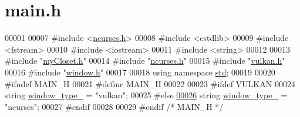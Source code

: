 \hypertarget{main_8h_source}{}\section{main.\+h}

\begin{DoxyCode}
00001 
00007 \textcolor{preprocessor}{#include <\mbox{\hyperlink{ncurses_8h}{ncurses.h}}>}
00008 \textcolor{preprocessor}{#include <cstdlib>}
00009 \textcolor{preprocessor}{#include <fstream>}
00010 \textcolor{preprocessor}{#include <iostream>}
00011 \textcolor{preprocessor}{#include <string>}
00012 
00013 \textcolor{preprocessor}{#include "\mbox{\hyperlink{myCloset_8h}{myCloset.h}}"}
00014 \textcolor{preprocessor}{#include "\mbox{\hyperlink{ncurses_8h}{ncurses.h}}"}
00015 \textcolor{preprocessor}{#include "\mbox{\hyperlink{vulkan_8h}{vulkan.h}}"}
00016 \textcolor{preprocessor}{#include "\mbox{\hyperlink{window_8h}{window.h}}"}
00017 
00018 \textcolor{keyword}{using namespace }\mbox{\hyperlink{namespacestd}{std}};
00019 
00020 \textcolor{preprocessor}{#ifndef MAIN\_H}
00021 \textcolor{preprocessor}{#define MAIN\_H}
00022 
00023 \textcolor{preprocessor}{#ifdef VULKAN}
00024 \textcolor{keywordtype}{string} \mbox{\hyperlink{main_8h_a9c6bd0ef77b9f23b249fedfd6f669d8a}{window\_type\_}} = \textcolor{stringliteral}{"vulkan"};
00025 \textcolor{preprocessor}{#else}
\mbox{\hyperlink{main_8h_a9c6bd0ef77b9f23b249fedfd6f669d8a}{00026}} \textcolor{keywordtype}{string} \mbox{\hyperlink{main_8h_a9c6bd0ef77b9f23b249fedfd6f669d8a}{window\_type\_}} = \textcolor{stringliteral}{"ncurses"};
00027 \textcolor{preprocessor}{#endif}
00028 
00029 \textcolor{preprocessor}{#endif }\textcolor{comment}{/* MAIN\_H */}\textcolor{preprocessor}{}
\end{DoxyCode}
